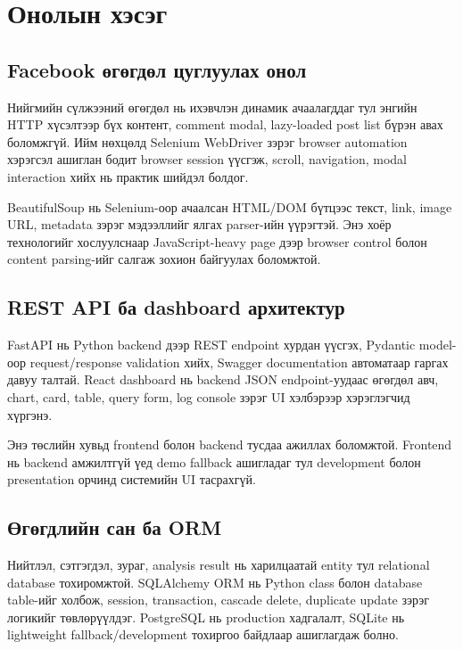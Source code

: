 \documentclass[
12pt,
oneside,
english,
onehalfspacing,
nolistspacing,
headsepline,
]{MUST-Thesis}
\begin{document}
\chapter{Онолын хэсэг}

\section{Facebook өгөгдөл цуглуулах онол}

Нийгмийн сүлжээний өгөгдөл нь ихэвчлэн динамик ачаалагддаг тул энгийн HTTP хүсэлтээр бүх контент, comment modal, lazy-loaded post list бүрэн авах боломжгүй. Ийм нөхцөлд Selenium WebDriver зэрэг browser automation хэрэгсэл ашиглан бодит browser session үүсгэж, scroll, navigation, modal interaction хийх нь практик шийдэл болдог.

BeautifulSoup нь Selenium-оор ачаалсан HTML/DOM бүтцээс текст, link, image URL, metadata зэрэг мэдээллийг ялгах parser-ийн үүрэгтэй. Энэ хоёр технологийг хослуулснаар JavaScript-heavy page дээр browser control болон content parsing-ийг салгаж зохион байгуулах боломжтой.

\section{REST API ба dashboard архитектур}

FastAPI нь Python backend дээр REST endpoint хурдан үүсгэх, Pydantic model-оор request/response validation хийх, Swagger documentation автоматаар гаргах давуу талтай. React dashboard нь backend JSON endpoint-уудаас өгөгдөл авч, chart, card, table, query form, log console зэрэг UI хэлбэрээр хэрэглэгчид хүргэнэ.

Энэ төслийн хувьд frontend болон backend тусдаа ажиллах боломжтой. Frontend нь backend амжилтгүй үед demo fallback ашигладаг тул development болон presentation орчинд системийн UI тасрахгүй.

\section{Өгөгдлийн сан ба ORM}

Нийтлэл, сэтгэгдэл, зураг, analysis result нь харилцаатай entity тул relational database тохиромжтой. SQLAlchemy ORM нь Python class болон database table-ийг холбож, session, transaction, cascade delete, duplicate update зэрэг логикийг төвлөрүүлдэг. PostgreSQL нь production хадгалалт, SQLite нь lightweight fallback/development тохиргоо байдлаар ашиглагдаж болно.
\end{document}

